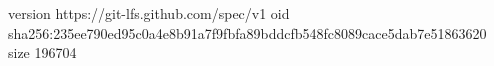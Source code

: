 version https://git-lfs.github.com/spec/v1
oid sha256:235ee790ed95c0a4e8b91a7f9fbfa89bddcfb548fc8089cace5dab7e51863620
size 196704
